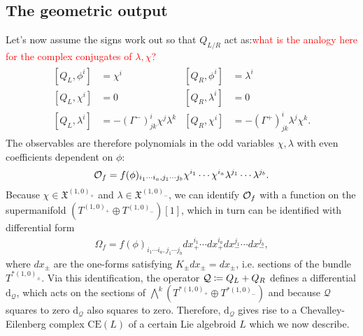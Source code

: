 \documentclass{article}
\newcommand{\XX}{\mathfrak{X}}
\newcommand{\QQ}{\mathcal{Q}}
\newcommand{\p}{\partial}
\newcommand{\rd}{\mathrm{d}}
\theoremstyle{definition}
\theoremstyle{definition}
\theoremstyle{remark}
\begin{document}
\subsection{The geometric output}
Let's now assume the signs work out so that $Q_{L/R}$ act as:\textcolor{red}{what is the analogy here for the complex conjugates of $\lambda,\chi$?}
\begin{align}\label{eq:Qcoh}
\begin{aligned}
[Q_L,\phi^i]&=\chi^i & [Q_R,\phi^i]&=\lambda^i\\
[Q_L,\chi^i]&=0 & [Q_R,\lambda^i]&=0\\
[Q_L,\lambda^i]&=-(\Gamma^-)^i_{jk}\chi^j\lambda^k & [Q_R,\chi^i]&=-(\Gamma^+)^i_{jk}\lambda^j\chi^k.
\end{aligned}
\end{align}
The observables are therefore polynomials in the odd variables $\chi,\lambda$ with even coefficients dependent on $\phi$:
\begin{align*}
{\cal O}_f=f(\phi)_{i_1\cdots i_a,j_1\cdots j_b}\chi^{i_1}\cdots\chi^{i_a}\lambda^{j_1}\cdots\lambda^{j_b}.
\end{align*}
Because $\chi \in \XX^{(1,0)_+}$ and $\lambda \in \XX^{(1,0)_-}$, we can identify ${\cal O}_f$ with a function on the supermanifold $(T^{(1,0)_+}\oplus T^{(1,0)_-})[1]$, which in turn can be identified with differential form
\begin{align*}
\Omega_f=f(\phi)_{i_1\cdots i_a,j_1\cdots j_b}dx^{i_1}_+\cdots dx^{i_a}_+ dx^{j_1}_- \cdots dx^{j_b}_-,
\end{align*}
where $dx_\pm$ are the one-forms satisfying $K_\pm dx_\pm=dx_\pm$, i.e. sections of the bundle $T^{*(1,0)_\pm}$. Via this identification, the operator ${\cal Q}\coloneqq Q_L+Q_R$ defines a differential $\rd_\QQ$, which
acts on the sections of $\bigwedge^k(T^{*(1,0)_+}\oplus T^{*(1,0)_-})$ and because $\QQ$ squares to zero $\rd_\QQ$ also squares to zero. Therefore, $\rd_\QQ$ gives rise to a Chevalley-Eilenberg complex $\text{CE}(L)$ of a certain Lie algebroid $L$ which we now describe.
\end{document}
